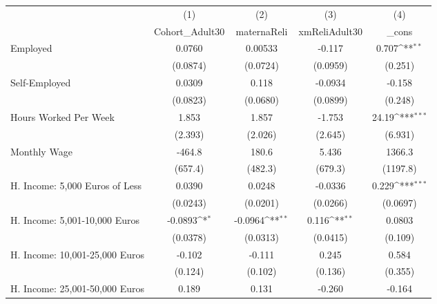 {
\def\sym#1{\ifmmode^{#1}\else\(^{#1}\)\fi}
\begin{tabular}{l*{4}{c}}
\hline\hline
            &\multicolumn{1}{c}{(1)}&\multicolumn{1}{c}{(2)}&\multicolumn{1}{c}{(3)}&\multicolumn{1}{c}{(4)}\\
            &\multicolumn{1}{c}{Cohort\_Adult30}&\multicolumn{1}{c}{maternaReli}&\multicolumn{1}{c}{xmReliAdult30}&\multicolumn{1}{c}{\_cons}\\
\hline
Employed    &      0.0760         &     0.00533         &      -0.117         &       0.707\sym{**} \\
            &    (0.0874)         &    (0.0724)         &    (0.0959)         &     (0.251)         \\
[1em]
Self-Employed&      0.0309         &       0.118         &     -0.0934         &      -0.158         \\
            &    (0.0823)         &    (0.0680)         &    (0.0899)         &     (0.248)         \\
[1em]
Hours Worked Per Week&       1.853         &       1.857         &      -1.753         &       24.19\sym{***}\\
            &     (2.393)         &     (2.026)         &     (2.645)         &     (6.931)         \\
[1em]
Monthly Wage&      -464.8         &       180.6         &       5.436         &      1366.3         \\
            &     (657.4)         &     (482.3)         &     (679.3)         &    (1197.8)         \\
[1em]
H. Income: 5,000 Euros of Less&      0.0390         &      0.0248         &     -0.0336         &       0.229\sym{***}\\
            &    (0.0243)         &    (0.0201)         &    (0.0266)         &    (0.0697)         \\
[1em]
H. Income: 5,001-10,000 Euros&     -0.0893\sym{*}  &     -0.0964\sym{**} &       0.116\sym{**} &      0.0803         \\
            &    (0.0378)         &    (0.0313)         &    (0.0415)         &     (0.109)         \\
[1em]
H. Income: 10,001-25,000 Euros&      -0.102         &      -0.111         &       0.245         &       0.584         \\
            &     (0.124)         &     (0.102)         &     (0.136)         &     (0.355)         \\
[1em]
H. Income: 25,001-50,000 Euros&       0.189         &       0.131         &      -0.260         &      -0.164         \\

\end{tabular}}
